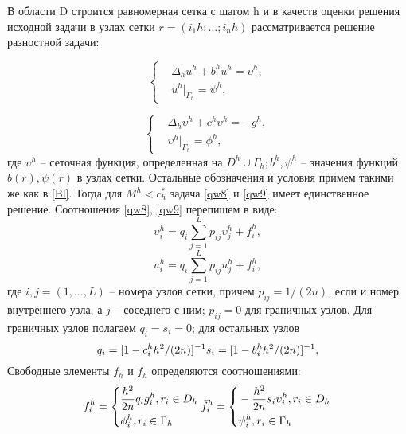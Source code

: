 В области D строится равномерная сетка с шагом h и в качеств
оценки решения исходной задачи в узлах сетки $r = (i_{1}h; \dots ; i_{n}h)$ рассматривается решение разностной задачи:

\begin{equation} 
	\left\{
\begin{aligned}
&\Delta_{h} u^{h} + b^{h}u^{h} =\upsilon^{h}, \\
&u^{h}|_{\Gamma_{h}} = \psi^{h},
\end{aligned}
 \right. \label{qw8}
\end{equation}

\begin{equation} 
	\left\{
\begin{aligned}
&\Delta_{h} \upsilon^{h} + c^{h}\upsilon^{h} =-g^{h},\\  & \upsilon^{h}|_{\Gamma_{h}} = \phi^{h}, 
\end{aligned}
 \right. \label{qw9}
\end{equation}
где $\upsilon^{h}$ -- сеточная функция, определенная на $D^{h} \cup \Gamma_{h}; b^{h}, \psi^{h}$ --  значения функций $b(r), \psi(r)$ в узлах сетки. Остальные обозначения и условия
примем такими же как в \ref{Bl}. Тогда для $M^{h} < c^{*}_{h}$  задача \ref{qw8} и \ref{qw9}
имеет единственное решение.
Соотношения \ref{qw8}, \ref{qw9} перепишем в виде:
\begin{equation}
	\upsilon^{h}_{i}=q_{i}\sum^{L}_{j=1}{p_{ij}\upsilon^{h}_{j}}+f^{h}_{i},
\end{equation}
\begin{equation}
	u^{h}_{i}=q_{i}\sum^{L}_{j=1}{p_{ij}u^{h}_{j}}+f^{h}_{i},
\end{equation}
где $i,j=(1,\dots,L)$ --  номера узлов сетки, причем $p_{ij}=1/(2n)$, если и 
номер внутреннего узла, а $j$ --  соседнего с ним; $p_{ij}= 0$ для граничных
узлов. Для граничных узлов полагаем $q_{i}=s_{i}=0$; для остальных узлов
\begin{equation}
	q_{i}=[1-c^{h}_{i}h^{2}/(2n)]^{-1} \\ s_{i}=[1-b^{h}_{i}h^{2}/(2n)]^{-1},
\end{equation}
Свободные элементы $f_{h}$ и 
$\bar{f}_{h}$ определяются соотношениями:
\begin{equation}
	f^{h}_{i}= 
	\left\{
\begin{aligned}
& \frac{h^{2}}{2n}q_{i}g^{h}_{i}, r_{i} \in D_{h}\\ & \phi^{h}_{i}, r_{i} \in \Gamma_{h}
\end{aligned}
 \right.\\
\bar{f}^{h}_{i}= 
	\left\{
\begin{aligned}
& -\frac{h^{2}}{2n}s_{i}\upsilon^{h}_{i}, r_{i} \in D_{h}\\ & \psi^{h}_{i}, r_{i} \in \Gamma_{h}
\end{aligned}
 \right.
\end{equation}
